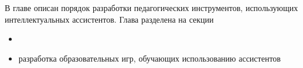 В главе описан порядок разработки  педагогических инструментов, использующих интеллектуальных ассистентов. Глава разделена на секции 
\begin{itemize}
    \item 
    \item разработка образовательных игр, обучающих использованию ассистентов 
\end{itemize}





